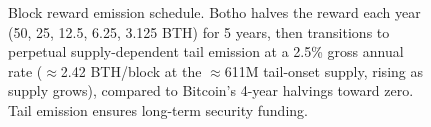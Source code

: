 \begin{figure}[ht]
\caption{Block reward emission schedule. Botho halves the reward each year
(50, 25, 12.5, 6.25, 3.125 BTH) for 5 years, then transitions to perpetual
supply-dependent tail emission at a 2.5\% gross annual rate
($\approx$2.42 BTH/block at the $\approx$611M tail-onset supply, rising as
supply grows), compared to Bitcoin's 4-year halvings toward zero. Tail
emission ensures long-term security funding.}
\label{fig:emission-curve}
\end{figure}
